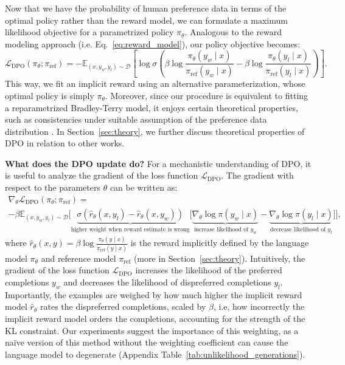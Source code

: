 \documentclass{article}
\newcommand{\rev}[2]{{#2}}
\newcommand{\piref}{\pi_\text{ref}}
\begin{document}
Now that we have 
the probability of human preference data in terms of the optimal policy rather than the reward model, we can formulate a maximum likelihood objective for a parametrized policy $\pi_\theta$. Analogous to the reward modeling approach (i.e. Eq.~\ref{eq:reward_model}), our policy objective becomes:
\begin{equation}\label{eq:optimum_model}
    \mathcal{L}_\text{DPO}(\pi_{\theta}; \piref) = -\mathbb{E}_{(x, y_w, y_l)\sim \mathcal{D}}\left[\log \sigma \left(\beta \log \frac{\pi_{\theta}(y_w\mid x)}{\piref(y_w\mid x)} - \beta \log \frac{\pi_{\theta}(y_l\mid x)}{\piref(y_l\mid x)}\right)\right].
\end{equation}
\rev{This way, we simultaneously bypass the explicit reward modeling step while also avoiding the need to perform reinforcement learning optimization.}{This way, we fit an implicit reward using an alternative parameterization, whose optimal policy is simply $\pi_\theta$.} Moreover, since our procedure is equivalent to fitting a reparametrized Bradley-Terry model, it enjoys certain theoretical properties, such as consistencies under suitable assumption of the preference data distribution \cite{bong2022generalized}. In Section~\ref{sec:theory}, we further discuss theoretical properties of DPO in relation to other works.

\textbf{What does the DPO update do?} For a mechanistic understanding of DPO, it is useful to analyze the gradient of the loss function $\mathcal{L}_\text{DPO}$. The gradient with respect to the parameters $\theta$ can be written as:
\begin{multline*}\label{eq:gradient}
    \nabla_\theta \mathcal{L}_\text{DPO}(\pi_\theta;\piref) = \\ -\beta\mathbb{E}_{(x, y_w, y_l) \sim \mathcal{D}} \bigg[\underbrace{\sigma(\hat{r}_\theta(x, y_l) - \hat{r}_\theta (x, y_w))}_\text{higher weight when reward estimate is wrong}\bigg[\underbrace{\nabla_\theta\log \pi(y_w \mid x)}_\text{increase likelihood of $y_w$} - \underbrace{\nabla_\theta\log\pi(y_l \mid x)}_\text{decrease likelihood of $y_l$}\bigg]\bigg],
\end{multline*}
where $\hat{r}_\theta(x, y) = \beta \log \frac{\pi_\theta(y \mid x)}{\piref(y \mid x)}$ is the reward implicitly defined by the language model $\pi_\theta$ and reference model $\piref$ (more in Section~\ref{sec:theory}). Intuitively, the gradient of the loss function $\mathcal{L}_\text{DPO}$ increases the likelihood of the preferred completions $y_w$ and decreases the likelihood of dispreferred completions $y_l$. Importantly, the examples are weighed by how much higher the implicit reward model $\hat{r}_\theta$ rates the dispreferred completions, scaled by $\beta$, i.e, how incorrectly the implicit reward model orders the completions, accounting for the strength of the KL constraint. Our experiments suggest the importance of this weighting, as a na\"ive version of this method without the weighting coefficient can cause the language model to degenerate (Appendix Table~\ref{tab:unlikelihood_generations}).
\end{document}
